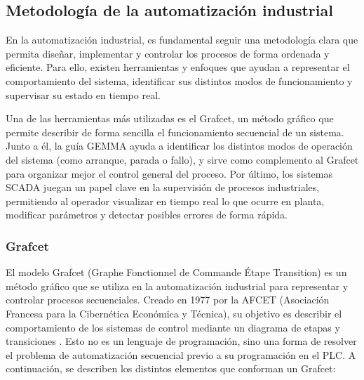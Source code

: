\subsection{Metodología de la automatización industrial}

En la automatización industrial, es fundamental seguir una metodología clara que permita diseñar, implementar y controlar los procesos de forma ordenada y eficiente. Para ello, existen herramientas y enfoques que ayudan a representar el comportamiento del sistema, identificar sus distintos modos de funcionamiento y supervisar su estado en tiempo real.

Una de las herramientas más utilizadas es el Grafcet, un método gráfico que permite describir de forma sencilla el funcionamiento secuencial de un sistema. Junto a él, la guía GEMMA ayuda a identificar los distintos modos de operación del sistema (como arranque, parada o fallo), y sirve como complemento al Grafcet para organizar mejor el control general del proceso. Por último, los sistemas SCADA juegan un papel clave en la supervisión de procesos industriales, permitiendo al operador visualizar en tiempo real lo que ocurre en planta, modificar parámetros y detectar posibles errores de forma rápida.

\newpage

\subsubsection{Grafcet}

El modelo Grafcet (Graphe Fonctionnel de Commande Étape Transition) es un método gráfico que se utiliza en la automatización industrial para representar y controlar procesos secuenciales. Creado en 1977 por la AFCET (Asociación Francesa para la Cibernética Económica y Técnica), su objetivo es describir el comportamiento de los sistemas de control mediante un diagrama de etapas y transiciones \cite{grafcet_info}. Esto no es un lenguaje de programación, sino una forma de resolver el problema de automatización secuencial previo a su programación en el PLC. A continuación, se describen los distintos elementos que conforman un Grafcet:

